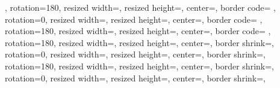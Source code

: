 {{{      },%
  }%
  {%
    rotation=180,%
    resized width=\resizedwidth,%
    resized height=\resizedheight,%
    center=\pgfpoint{.75\pgfphysicalwidth-.5\printermarginx}{.75\pgfphysicalheight-.5\printermarginy},%
    border code={%
        \color{gray!50}\pgfsetlinewidth{.75pt}%
        \pgfsetdash{{20pt}{10pt}}{0pt}%
        \pgfpathlineto{\pgfpoint{0pt}{0pt}}%
        \color{black}%
        \pgfsetdash{}{0pt}%
      },%
  }%
  {%
    rotation=0,%
    resized width=\resizedwidth,%
    resized height=\resizedheight,%
    center=\pgfpoint{.25\pgfphysicalwidth+.5\printermarginx}{.25\pgfphysicalheight+.5\printermarginy},%
    border code={%
        \color{gray!50}\pgfsetlinewidth{.75pt}%
        \pgfsetdash{{20pt}{10pt}}{0pt}%
        \pgfpathlineto{\pgfpoint{0pt}{0pt}}%
        \color{black}%
        \pgfsetdash{}{0pt}%
      },%
  }%
  {%
    rotation=180,%
    resized width=\resizedwidth,%
    resized height=\resizedheight,%
    center=\pgfpoint{.75\pgfphysicalwidth-.5\printermarginx}{.25\pgfphysicalheight+.5\printermarginy},%
    border code={%
        \color{gray!50}\pgfsetlinewidth{.75pt}%
        \pgfsetdash{{20pt}{10pt}}{0pt}%
        \pgfpathmoveto{\pgfpoint{0pt}{0pt}}%
        \color{black}%
        \pgfsetdash{}{0pt}%
      },%
  }%
  {%
    rotation=180,%
    resized width=\resizedwidth,%
    resized height=\resizedheight,%
    center=\pgfpoint{.25\pgfphysicalwidth+.5\printermarginx}{.75\pgfphysicalheight-.5\printermarginy},%
    border shrink=\pgfpageoptionborder,%
  }%
  {%
    rotation=0,%
    resized width=\resizedwidth,%
    resized height=\resizedheight,%
    center=\pgfpoint{.75\pgfphysicalwidth-.5\printermarginx}{.75\pgfphysicalheight-.5\printermarginy},%
    border shrink=\pgfpageoptionborder,%
  }%
  {%
    rotation=180,%
    resized width=\resizedwidth,%
    resized height=\resizedheight,%
    center=\pgfpoint{.25\pgfphysicalwidth+.5\printermarginx}{.25\pgfphysicalheight+.5\printermarginy},%
    border shrink=\pgfpageoptionborder,%
  }%
  {%
    rotation=0,%
    resized width=\resizedwidth,%
    resized height=\resizedheight,%
    center=\pgfpoint{.75\pgfphysicalwidth-.5\printermarginx}{.25\pgfphysicalheight+.5\printermarginy},%
    border shrink=\pgfpageoptionborder,%
  }%
}


\renewcommand{\clearcard}{\cleardoublepage}
